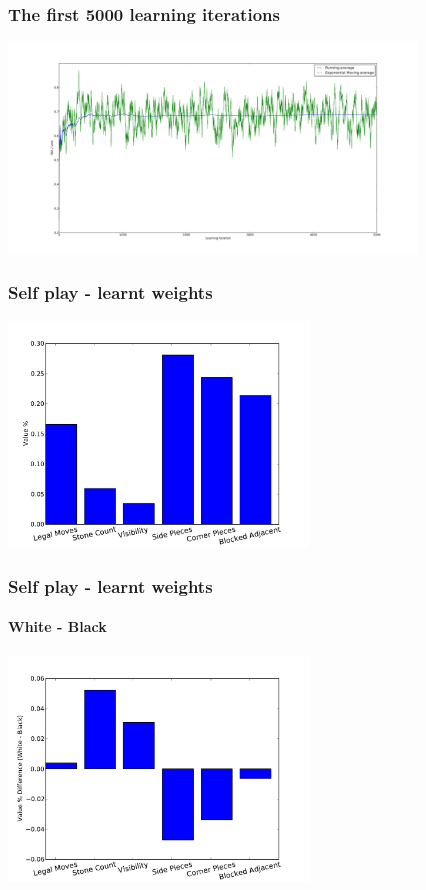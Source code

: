 \documentclass[10pt]{beamer}
\begin{document}
\begin{frame}
  \frametitle{The first 5000 learning iterations}
  \begin{center} \includegraphics[trim= 6cm 2cm 2cm 2cm, clip, height=5.6cm]{Graphs/Learning_2ply_First5000_exp.pdf} \end{center}
\end{frame}

\begin{frame}
  \frametitle{Self play - learnt weights}
  \begin{center} \includegraphics[height=6cm]{Graphs/SelfPlay_Weights.pdf}  \end{center} 
\end{frame}

\begin{frame}
  \frametitle{Self play - learnt weights}
  \framesubtitle{White - Black}
  \begin{center} \includegraphics[height=6cm]{Graphs/SelfPlay_Weights_WhiteBlackDiff.pdf}  \end{center} 
\end{frame}
\end{document}
